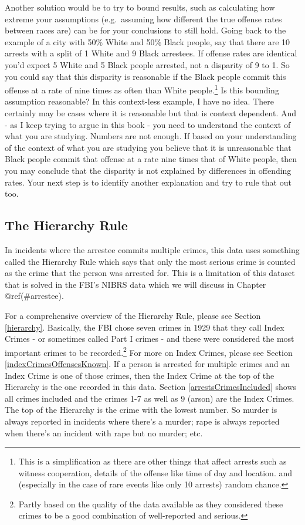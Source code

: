 \documentclass[
]{krantz}
\begin{document}
Another solution would be to try to bound results, such as
calculating how extreme your assumptions (e.g.~assuming how
different the true offense rates between races are) can be
for your conclusions to still hold. Going back to the
example of a city with 50\% White and 50\% Black people, say
that there are 10 arrests with a split of 1 White and 9
Black arrestees. If offense rates are identical you'd expect
5 White and 5 Black people arrested, not a disparity of 9 to
1. So you could say that this disparity is reasonable if the
Black people commit this offense at a rate of nine times as
often than White people.\footnote{This is a simplification
  as there are other things that affect arrests such as
  witness cooperation, details of the offense like time of
  day and location. and (especially in the case of rare
  events like only 10 arrests) random chance.} Is this
bounding assumption reasonable? In this context-less
example, I have no idea. There certainly may be cases where
it is reasonable but that is context dependent. And - as I
keep trying to argue in this book - you need to understand
the context of what you are studying. Numbers are not
enough. If based on your understanding of the context of
what you are studying you believe that it is unreasonable
that Black people commit that offense at a rate nine times
that of White people, then you may conclude that the
disparity is not explained by differences in offending
rates. Your next step is to identify another explanation and
try to rule that out too.

\subsection{The Hierarchy Rule}\label{the-hierarchy-rule}

In incidents where the arrestee commits multiple crimes,
this data uses something called the Hierarchy Rule which
says that only the most serious crime is counted as the
crime that the person was arrested for. This is a limitation
of this dataset that is solved in the FBI's NIBRS data which
we will discuss in Chapter @ref(\#arrestee).

For a comprehensive overview of the Hierarchy Rule, please
see Section \ref{hierarchy}. Basically, the FBI chose seven
crimes in 1929 that they call Index Crimes - or sometimes
called Part I crimes - and these were considered the most
important crimes to be recorded.\footnote{Partly based on
  the quality of the data available as they considered these
  crimes to be a good combination of well-reported and
  serious.} For more on Index Crimes, please see Section
\ref{indexCrimesOffensesKnown}. If a person is arrested for
multiple crimes and an Index Crime is one of those crimes,
then the Index Crime at the top of the Hierarchy is the one
recorded in this data. Section \ref{arrestsCrimesIncluded}
shows all crimes included and the crimes 1-7 as well as 9
(arson) are the Index Crimes. The top of the Hierarchy is
the crime with the lowest number. So murder is always
reported in incidents where there's a murder; rape is always
reported when there's an incident with rape but no murder;
etc.
\end{document}
